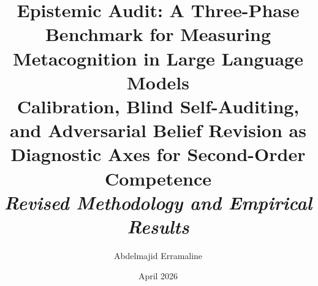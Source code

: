 \documentclass[12pt,a4paper]{article}
\begin{document}
\title{
    \vspace{-1.5em}
    \textbf{Epistemic Audit: A Three-Phase Benchmark for Measuring\\
    Metacognition in Large Language Models}\\[0.8em]
    \large\normalfont Calibration, Blind Self-Auditing, and Adversarial
    Belief Revision as Diagnostic Axes for Second-Order Competence\\[0.4em]
      \normalsize\normalfont \textit{Revised Methodology and Empirical Results}
}

\author[1]{Abdelmajid Erramaline}
\date{April 2026}

\maketitle
\thispagestyle{empty}
\end{document}
